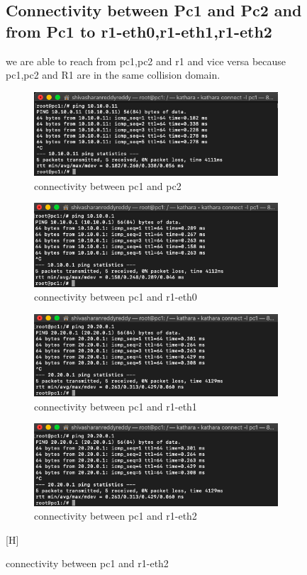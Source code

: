 \begin{figure}[H]
\subsection{Connectivity between Pc1 and Pc2 and from Pc1 to r1-eth0,r1-eth1,r1-eth2}
we are able to reach from pc1,pc2 and r1 and vice versa because pc1,pc2 and R1 are in the same collision domain.
\begin{figure}[H]
\centering
  \includegraphics[width=400pt]{Images/Connectivity between Pc1 and Pc2.png}
  \caption{connectivity between pc1 and pc2}
  \label{fig:3.1}
\end{figure}
\begin{figure}[H]
\centering
  \includegraphics[width=400pt]{Images/Connectivity between Pc1 and R1-eth0.png}
  \caption{connectivity between pc1 and r1-eth0}
  \label{fig:3.1}
\end{figure}
\begin{figure}[H]
\centering
  \includegraphics[width=400pt]{Images/Connectivity between pc1 and r1-eth2.png}
  \caption{connectivity between pc1 and r1-eth1}
  \label{fig:3.1}
\end{figure}
\begin{figure}[H]
\centering
  \includegraphics[width=400pt]{Images/Connectivity between pc1 and r1-eth2.png}
  \caption{connectivity between pc1 and r1-eth2}
  \label{fig:3.1}
\end{figure} [H]

\end{figure}
